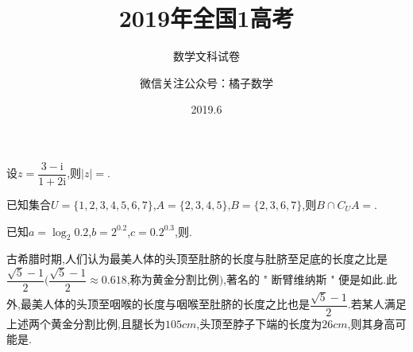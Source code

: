 \documentclass[a4paper]{BHCexam}
\begin{document}
\title{2019年全国1高考}
\subtitle{数学文科试卷}
\author{微信关注公众号：橘子数学}
\date{2019.6}
\maketitle

\begin{groups}
\begin{questions}[]
\begin{minipage}{\textwidth}
\question[5] 设$z= \dfrac {3-\mathrm{i}}{1+2\mathrm{i}}$,则$|z|=$.
\begin{solution}{4cm}

\end{solution}
\end{minipage}
\begin{minipage}{\textwidth}
\question[5] 已知集合$U=\{1 , 2 , 3 , 4 , 5 , 6 , 7\}$,$A=\{2 , 3 , 4 , 5\}$,$B=\{2 , 3 , 6 , 7\}$,则$B \cap  {C}_{U}A =$.
\begin{solution}{4cm}

\end{solution}
\end{minipage}
\begin{minipage}{\textwidth}
\question[5] 已知$a=\log _{2} 0.2$,$b=2 ^{0.2}$,$c=0.2 ^{0.3}$,则.
\begin{solution}{4cm}

\end{solution}
\end{minipage}
\begin{minipage}{\textwidth}
\question[5] 古希腊时期,人们认为最美人体的头顶至肚脐的长度与肚脐至足底的长度之比是$\dfrac{ \sqrt{5} - 1}{2} ( \dfrac{ \sqrt{5} - 1}{2}  \approx 0.618$,称为黄金分割比例$)$,著名的 " 断臂维纳斯 " 便是如此$.$此外,最美人体的头顶至咽喉的长度与咽喉至肚脐的长度之比也是$\dfrac{ \sqrt{5} - 1}{2} .$若某人满足上述两个黄金分割比例,且腿长为$105cm$,头顶至脖子下端的长度为$26 cm$,则其身高可能是.


\end{minipage}
\end{questions}
\end{groups}
\end{document}
